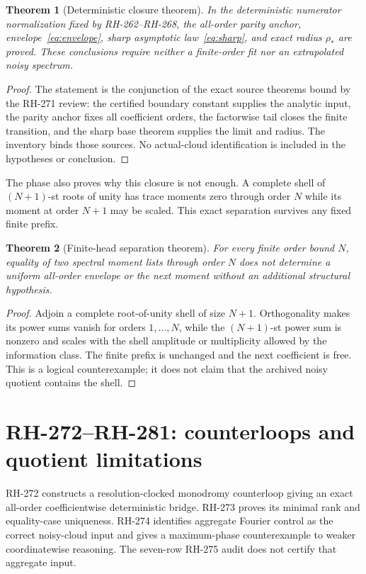 \documentclass[11pt]{article}
\newtheorem{theorem}{Theorem}[section]
\theoremstyle{definition}
\theoremstyle{remark}
\begin{document}
\begin{theorem}[Deterministic closure theorem]\label{thm:deterministic}
In the deterministic numerator normalization fixed by RH-262--RH-268, the
all-order parity anchor, envelope~\eqref{eq:envelope}, sharp asymptotic
law~\eqref{eq:sharp}, and exact radius $\rho_*$ are proved.  These conclusions
require neither a finite-order fit nor an extrapolated noisy spectrum.
\end{theorem}
\begin{proof}
The statement is the conjunction of the exact source theorems bound by the
RH-271 review: the certified boundary constant supplies the analytic input,
the parity anchor fixes all coefficient orders, the factorwise tail closes
the finite transition, and the sharp base theorem supplies the limit and
radius.  The inventory binds those sources.  No actual-cloud identification
is included in the hypotheses or conclusion.
\end{proof}

The phase also proves why this closure is not enough.  A complete shell of
$(N+1)$-st roots of unity has trace moments zero through order $N$ while its
moment at order $N+1$ may be scaled.  This exact separation survives any
fixed finite prefix.

\begin{theorem}[Finite-head separation theorem]\label{thm:separation}
For every finite order bound $N$, equality of two spectral moment lists
through order $N$ does not determine a uniform all-order envelope or the
next moment without an additional structural hypothesis.
\end{theorem}
\begin{proof}
Adjoin a complete root-of-unity shell of size $N+1$.  Orthogonality makes its
power sums vanish for orders $1,\ldots,N$, while the $(N+1)$-st power sum is
nonzero and scales with the shell amplitude or multiplicity allowed by the
information class.  The finite prefix is unchanged and the next coefficient
is free.  This is a logical counterexample; it does not claim that the
archived noisy quotient contains the shell.
\end{proof}

\section{RH-272--RH-281: counterloops and quotient limitations}

RH-272 constructs a resolution-clocked monodromy counterloop giving an exact
all-order coefficientwise deterministic bridge.  RH-273 proves its minimal
rank and equality-case uniqueness.  RH-274 identifies aggregate Fourier
control as the correct noisy-cloud input and gives a maximum-phase
counterexample to weaker coordinatewise reasoning.  The seven-row RH-275
audit does not certify that aggregate input.
\end{document}
